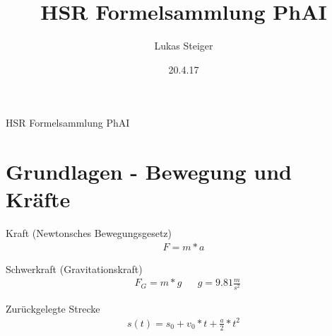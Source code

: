 \documentclass[17pt]{extarticle}
\author{Lukas Steiger}
\title{HSR Formelsammlung PhAI}
\date{20.4.17}
\begin{document}
\begin{center}
	\huge{HSR Formelsammlung PhAI}
\end{center}
	
\section{Grundlagen - Bewegung und Kräfte}
	
	Kraft \small{(Newtonsches Bewegungsgesetz)}
	\begin{align}
		F = m * a
	\end{align}
	
	Schwerkraft \small{(Gravitationskraft)}
	\begin{align}
		&F_{G} = m * g
		&&g = 9.81 \frac{m}{s^{2}} 
	\end{align}

	Zurückgelegte Strecke
	\begin{align}
		s(t) = s_{0} + v_{0} * t + \frac{a}{2} * t^{2}
	\end{align}
	
\end{document}
